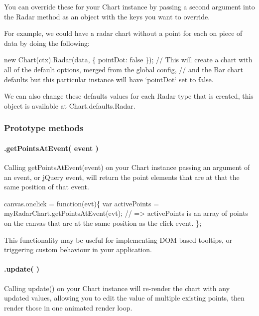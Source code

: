 You can override these for your {\ttfamily Chart} instance by passing a second argument into the {\ttfamily Radar} method as an object with the keys you want to override.

For example, we could have a radar chart without a point for each on piece of data by doing the following\+:


\begin{DoxyCode}
new Chart(ctx).Radar(data, \{
    pointDot: false
\});
// This will create a chart with all of the default options, merged from the global config,
//  and the Bar chart defaults but this particular instance will have `pointDot` set to false.
\end{DoxyCode}


We can also change these defaults values for each Radar type that is created, this object is available at {\ttfamily Chart.\+defaults.\+Radar}.

\subsubsection*{Prototype methods}

\paragraph*{.get\+Points\+At\+Event( event )}

Calling {\ttfamily get\+Points\+At\+Event(event)} on your Chart instance passing an argument of an event, or j\+Query event, will return the point elements that are at that the same position of that event.


\begin{DoxyCode}
canvas.onclick = function(evt)\{
    var activePoints = myRadarChart.getPointsAtEvent(evt);
    // => activePoints is an array of points on the canvas that are at the same position as the click
       event.
\};
\end{DoxyCode}


This functionality may be useful for implementing D\+OM based tooltips, or triggering custom behaviour in your application.

\paragraph*{.update( )}

Calling {\ttfamily update()} on your Chart instance will re-\/render the chart with any updated values, allowing you to edit the value of multiple existing points, then render those in one animated render loop.


